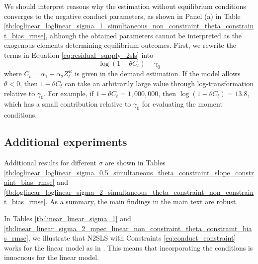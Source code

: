 \documentclass[11pt, a4paper]{article}
\theoremstyle{remark}
\begin{document}
We should interpret reasons why the estimation without equilibrium conditions converges to the negative conduct parameters, as shown in Panel (a) in Table \ref{tb:loglinear_loglinear_sigma_1_simultaneous_non_constraint_theta_constraint_bias_rmse}, although the obtained parameters cannot be interpreted as the exogenous elements determining equilibrium outcomes. 
First, we rewrite the terms in Equation \eqref{eq:residual_supply_2sls} into $$\log(1 - \theta C_{t})-\gamma_{0}$$
where $C_{t}=\alpha_1 + \alpha_2 Z^{R}_{t}$ is given in the demand estimation.
If the model allows $\theta<0$, then $1 - \theta C_{t}$ can take an arbitrarily large value through log-transformation relative to $\gamma_0$. 
For example, if $1 - \theta C_{t}=1,000,000$, then $\log(1 - \theta C_{t})=13.8$, which has a small contribution relative to $\gamma_0$ for evaluating the moment conditions.





\subsection{Additional experiments}\label{sec:additional_experiments}

Additional results for different $\sigma$ are shown in Tables \ref{tb:loglinear_loglinear_sigma_0.5_simultaneous_theta_constraint_slope_constraint_bias_rmse} and \ref{tb:loglinear_loglinear_sigma_2_simultaneous_theta_constraint_non_constraint_bias_rmse}. 
As a summary, the main findings in the main text are robust.

In Tables \ref{tb:linear_linear_sigma_1} and  \ref{tb:linear_linear_sigma_2_mpec_linear_non_constraint_theta_constraint_bias_rmse}, we illustrate that N2SLS with Constraints \eqref{eq:conduct_constraint} works for the linear model as in \cite{matsumura2023resolving}. 
This means that incorporating the conditions is innocuous for the linear model. 
\end{document}
